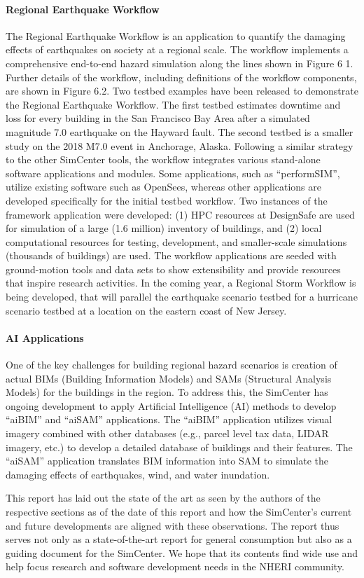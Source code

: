 \paragraph{Regional Earthquake Workflow} The Regional Earthquake Workflow is an application to quantify the damaging effects of earthquakes on society at a regional scale. The workflow implements a comprehensive end-to-end hazard simulation along the lines shown in Figure 6 1. Further details of the workflow, including definitions of the workflow components, are shown in Figure 6.2. Two testbed examples have been released to demonstrate the Regional Earthquake Workflow. The first testbed estimates downtime and loss for every building in the San Francisco Bay Area after a simulated magnitude 7.0 earthquake on the Hayward fault. The second testbed is a smaller study on the 2018 M7.0 event in Anchorage, Alaska. Following a similar strategy to the other SimCenter tools, the workflow integrates various stand-alone software applications and modules. Some applications, such as “performSIM”, utilize existing software such as OpenSees, whereas other applications are developed specifically for the initial testbed workflow. Two instances of the framework application were developed:        (1) HPC resources at DesignSafe are used for simulation of a large (1.6 million) inventory of buildings, and (2) local computational resources for testing, development, and smaller-scale simulations (thousands of buildings) are used. The workflow applications are seeded with ground-motion tools and data sets to show extensibility and provide resources that inspire research activities. In the coming year, a Regional Storm Workflow is being developed, that will parallel the earthquake scenario testbed for a hurricane scenario testbed at a location on the eastern coast of New Jersey.

\paragraph{AI Applications} One of the key challenges for building regional hazard scenarios is creation of actual BIMs (Building Information Models) and SAMs (Structural Analysis Models) for the buildings in the region. To address this, the SimCenter has ongoing development to apply Artificial Intelligence (AI) methods to develop “aiBIM” and “aiSAM” applications. The “aiBIM” application utilizes visual imagery combined with other databases (e.g., parcel level tax data, LIDAR imagery, etc.) to develop a detailed database of buildings and their features. The “aiSAM” application translates BIM information into SAM to simulate the damaging effects of earthquakes, wind, and water inundation.

\noindent This report has laid out the state of the art as seen by the authors of the respective sections as of the date of this report and how the SimCenter's current and future developments are aligned with these observations. The report thus serves not only as a state-of-the-art report for general consumption but also as a guiding document for the SimCenter. We hope that its contents find wide use and help focus research and software development needs in the NHERI community.
